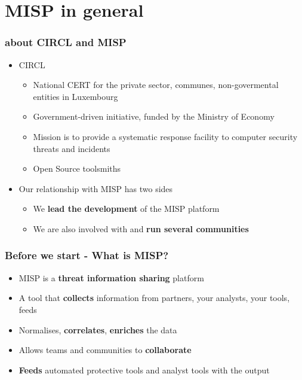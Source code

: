 
\begin{frame}[t,plain]
\titlepage
\end{frame}

\section{MISP in general}

\begin{frame}
    \frametitle{about CIRCL and MISP}
    \begin{itemize}
        \item CIRCL
        \begin{itemize}
            \item National CERT for the private sector, communes, non-govermental entities in Luxembourg
            \item Government-driven initiative, funded by the Ministry of Economy
            \item Mission is to provide a systematic response facility to computer security threats and incidents
            \item Open Source toolsmiths
        \end{itemize}
        \item Our relationship with MISP has two sides
        \begin{itemize}
            \item We {\bf lead the development} of the MISP platform
            \item We are also involved with and {\bf run several communities}
        \end{itemize}
    \end{itemize}
\end{frame}

\begin{frame}
\frametitle{Before we start - What is MISP?}
\begin{itemize}
       \item MISP is a {\bf threat information sharing} platform
       \item A tool that {\bf collects} information from partners, your analysts, your tools, feeds
       \item Normalises, {\bf correlates}, {\bf enriches} the data
       \item Allows teams and communities to {\bf collaborate}
       \item {\bf Feeds} automated protective tools and analyst tools with the output
\end{itemize}
\end{frame}

